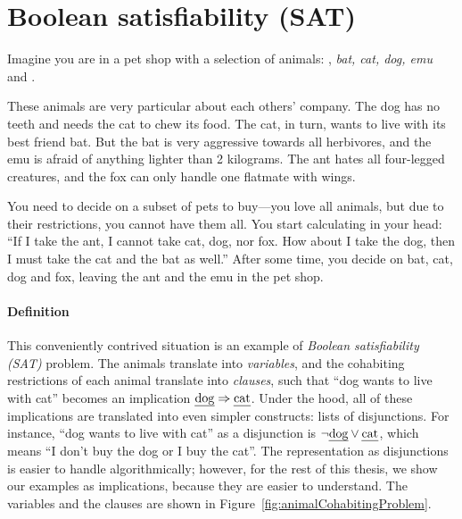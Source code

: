 \def\ant{\text{\em ant}}
\def\bat{\text{\em bat}}
\def\cat{\text{\em cat}}
\def\dog{\text{\em dog}}
\def\emu{\text{\em emu}}
\def\fox{\text{\em fox}}


\section{Boolean satisfiability (SAT)}
\label{sec:SAT-intro}

Imagine you are in a pet shop with a selection of animals: \ant, {\em bat, cat, dog, emu} and \fox.

These animals are very particular about each others' company. The dog has no teeth and needs the cat to chew its food. The cat, in turn, wants to live with its best friend bat.
But the bat is very aggressive towards all herbivores, and the emu is afraid of anything lighter than 2 kilograms. The ant hates all four-legged creatures, and the fox can only handle one flatmate with wings.

You need to decide on a subset of pets to buy---you love all animals, but due to their restrictions, you cannot have them all. You start calculating in your head: ``If I take the ant, I cannot take cat, dog, nor fox. How about I take the dog, then I must take the cat and the bat as well.''
After some time, you decide on bat, cat, dog and fox, leaving the ant and the emu in the pet shop.

\paragraph{Definition}

This conveniently contrived situation is an example of \emph{Boolean satisfiability (SAT)} problem.
The animals translate into \emph{variables}, %
and the cohabiting restrictions of each animal translate into \emph{clauses},
such that ``dog wants to live with cat'' becomes an implication $\dog \Rightarrow \cat$.
Under the hood, all of these implications are translated into even simpler constructs: lists of disjunctions.
For instance, ``dog wants to live with cat'' as a disjunction is %
$\neg\dog \vee \cat{}$, which means ``I don't buy the dog or I buy the cat''.
The representation as disjunctions is easier to handle algorithmically; however,
for the rest of this thesis, we show our examples as implications, because they are easier to understand.
The variables and the clauses are shown in Figure~\ref{fig:animalCohabitingProblem}.



